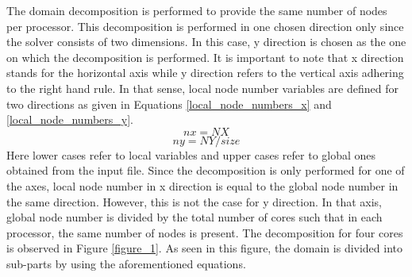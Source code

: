\documentclass{article}
\begin{document}
The domain decomposition is performed to provide the same number of nodes per processor. This decomposition is performed in one chosen direction only since the solver consists of two dimensions. In this case, y direction is chosen as the one on which the decomposition is performed. It is important to note that x direction stands for the horizontal axis while y direction refers to the vertical axis adhering to the right hand rule. In that sense, local node number variables are defined for two directions as given in Equations \ref{local_node_numbers_x} and \ref{local_node_numbers_y}. 
\begin{equation}  
    nx = NX 
    \label{local_node_numbers_x}
\end{equation}
\begin{equation}  
    ny = NY/size
    \label{local_node_numbers_y}
\end{equation}
Here lower cases refer to local variables and upper cases refer to global ones obtained from the input file. Since the decomposition is only performed for one of the axes, local node number in x direction is equal to the global node number in the same direction. However, this is not the case for y direction. In that axis, global node number is divided by the total number of cores such that in each processor, the same number of nodes is present. The decomposition for four cores is observed in Figure \ref{figure_1}. As seen in this figure, the domain is divided into sub-parts by using the aforementioned equations.\\
\end{document}
